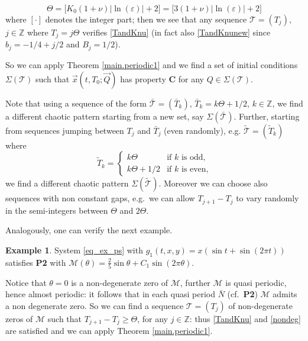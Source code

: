 \documentclass[10pt]{article}
\numberwithin{equation}{section}
\def\ep{\varepsilon}
\def\Z{{\mathbb Z}}
\def\MM{{\mathcal M}}
\def\TT{{\mathcal T}}
\def\Q{\vec{Q}}
\def\x{\vec{x}}
\def\ogap{\Theta}   %
\def\aaa{\theta}
\newcommand\assump[1]{{\rm\textbf{#1}}}
\theoremstyle{definition}
\newtheorem{example}[theorem]{Example}
\theoremstyle{remark}
\begin{document}
$$ \ogap = \big[K_0(1+\nu) |\ln(\ep)|+2 \big]= \big[3(1+\nu) |\ln(\ep)|+2 \big]  $$
where $[ \cdot ]$ denotes the integer part; then we see that any sequence $\TT=(T_j)$, $j \in \Z$ where
$T_j=j \ogap$ verifies \eqref{TandKnu} (in fact also \eqref{TandKnunew}  since $b_j= -1/4 +j/2$  and
$B_j=1/2$).

So we can apply Theorem \ref{main.periodic1} and we find a %
set of initial conditions
$\Sigma(\TT)$ such that $\x(t,T_0;\Q)$ has property \assump{C} for any $Q \in \Sigma(\TT)$.

\smallskip

 Note that    using a  sequence of the form $\bar{\TT}=(\bar{T}_k)$, $\bar{T}_k= k \ogap+1/2$,
$k \in \Z$, we find a different chaotic pattern starting from a new
set, say $\Sigma(\bar{\TT})$.
Further, starting from sequences jumping between
$T_j$ and $\bar{T}_j$ (even randomly), e.g.
$\tilde{\TT}=(\tilde{T}_k)$ where
$$\tilde{T}_k= \left\{ \begin{array}{cc}
                         k \ogap & \textrm{if $k$ is odd},\\
                         k\ogap +1/2 & \textrm{if $k$ is even,}
                       \end{array}    \right.$$
                       we find a different chaotic pattern $\Sigma(\tilde{\TT})$.
                       Moreover we can choose also sequences with non constant gaps, e.g.\ we can allow $T_{j+1}-T_j$ to vary randomly in the
                       semi-integers between
                       $\ogap$ and $2\ogap$.

 \smallskip







Analogously, one can verify the next example.

\begin{example}
	System \eqref{eq_ex_ps} with $g_1(t,x,y)=x (\sin t+\sin(2\pi t))$ satisfies \assump{P2} with
	$\mathcal{M}(\aaa)= \frac{2}{5}\sin\aaa+C_1\sin(2\pi\aaa)$.
\end{example}
Notice that $\aaa=0$ is a non-degenerate zero of $\MM$, further $\MM$ is quasi periodic, hence almost periodic:
it follows that in each quasi period $\bar{N}$ (cf.~\assump{P2}) $\MM$ admits a non degenerate zero.
So we can find a sequence $\TT=(T_j)$ of non-degenerate zeros of $\MM$ such that $T_{j+1}-T_j \ge \ogap$, for any $j \in \Z$: thus \eqref{TandKnu}    and \eqref{nondeg} are satisfied and we can apply
Theorem \ref{main.periodic1}.
\end{document}
